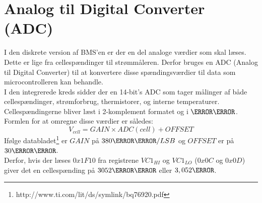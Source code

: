 \section{Analog til Digital Converter (ADC)}
I den diskrete version af BMS'en er der en del analoge værdier som skal læses. Dette er lige fra cellespændinger til strømmåleren. Derfor bruges en ADC (Analog til Digital Converter) til at konvertere disse spændingsværdier til data som microcontrolleren kan behandle. \\

I den integrerede kreds sidder der en 14-bit's ADC som tager målinger af både cellespændinger, strømforbrug, thermistorer, og interne temperaturer. Cellespændingerne bliver læst i 2-komplement formatet og i $\milli\volt$. Formlen for at omregne disse værdier er således: 
\begin {equation} 
V_{cell} = GAIN \times ADC(cell) + OFFSET
\end {equation}
Ifølge databladet\footnote{http://www.ti.com/lit/ds/symlink/bq76920.pdf} er $GAIN$ på $380\micro\volt/LSB$ og $OFFSET$ er på $30\milli\volt$. \\

Derfor, hvis der læses $0x1F10$ fra registrene $VC1_{HI}$ og $VC1_{LO}$ ($0x0C$ og $0x0D$) giver det en cellespænding på $3052\milli\volt$ eller $3,052\volt$.